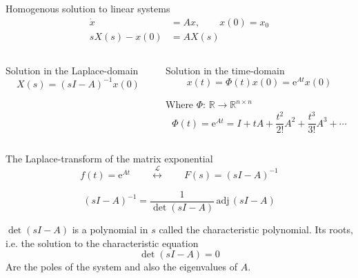 \documentclass[presentation,aspectratio=169]{beamer}
\begin{document}
\begin{frame}[label={sec:org7ae595b}]{Homogenous solution to linear systems}
\small
\begin{align*}
\dot{x} &= Ax, \qquad x(0) = x_0\\
 sX(s) - x(0) &= AX(s)
 \end{align*}
\pause

\begin{columns}
\begin{column}{0.5\columnwidth}
\begin{block}{Solution in the Laplace-domain}
\[X(s) = (sI-A)^{-1}x(0)\]
\end{block}
\end{column}


\begin{column}{0.5\columnwidth}
\begin{block}{Solution in the time-domain}
\[ x(t) = \Phi(t)x(0) = \mathrm{e}^{At}x(0)\]

Where  \(\Phi:\,\mathbb{R} \rightarrow \mathbb{R}^{n\times n}\) \[\Phi(t)=\mathrm{e}^{At} = I + tA + \frac{t^2}{2!}A^2 + \frac{t^3}{3!}A^3 + \cdots\] 
\end{block}
\end{column}
\end{columns}
\end{frame}

\begin{frame}[label={sec:org001d5cc}]{The Laplace-transform of the matrix exponential}
\[ f(t)=\mathrm{e}^{At} \qquad \overset{\mathcal{L}}{\longleftrightarrow} \qquad F(s) = (sI-A)^{-1} \]

\pause

\[(sI-A)^{-1} = \frac{1}{\det (sI-A)} \, \text{adj}\, (sI-A) \]

\(\det (sI-A)\) is a polynomial in \(s\) called \alert{the characteristic polynomial}. Its roots, i.e. the solution to the  \alert{characteristic equation}
\[ \det(sI-A) = 0\]
Are the \alert{poles} of the system and also the \alert{eigenvalues} of \(A\).
\end{frame}
\end{document}
